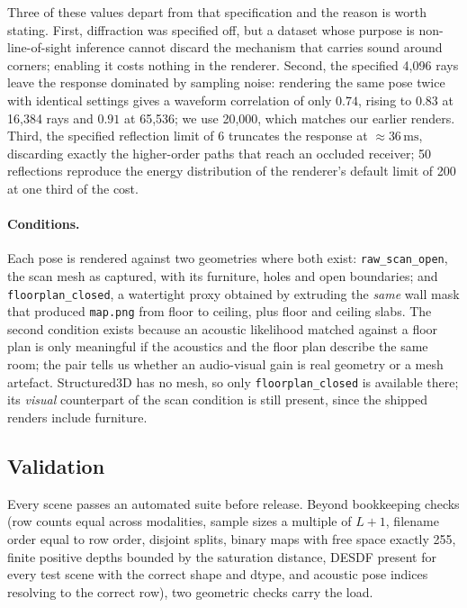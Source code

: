 Three of these values depart from that specification and the reason is worth
stating. First, diffraction was specified off, but a dataset whose purpose is
non-line-of-sight inference cannot discard the mechanism that carries sound around
corners; enabling it costs nothing in the renderer. Second, the specified 4{,}096
rays leave the response dominated by sampling noise: rendering the same pose twice
with identical settings gives a waveform correlation of only $0.74$, rising to
$0.83$ at 16{,}384 rays and $0.91$ at 65{,}536; we use 20{,}000, which matches our
earlier renders. Third, the specified reflection limit of 6 truncates the response
at ${\approx}36\,\mathrm{ms}$, discarding exactly the higher-order paths that reach
an occluded receiver; 50 reflections reproduce the energy distribution of the
renderer's default limit of 200 at one third of the cost.

\paragraph{Conditions.}
Each pose is rendered against two geometries where both exist:
\texttt{raw\_scan\_open}, the scan mesh as captured, with its furniture, holes and
open boundaries; and \texttt{floorplan\_closed}, a watertight proxy obtained by
extruding the \emph{same} wall mask that produced \texttt{map.png} from floor to
ceiling, plus floor and ceiling slabs. The second condition exists because an
acoustic likelihood matched against a floor plan is only meaningful if the
acoustics and the floor plan describe the same room; the pair tells us whether an
audio-visual gain is real geometry or a mesh artefact. Structured3D has no mesh, so
only \texttt{floorplan\_closed} is available there; its \emph{visual} counterpart
of the scan condition is still present, since the shipped renders include
furniture.

\subsection{Validation}
\label{sec:supp-validation}

Every scene passes an automated suite before release. Beyond bookkeeping checks
(row counts equal across modalities, sample sizes a multiple of $L{+}1$, filename
order equal to row order, disjoint splits, binary maps with free space exactly 255,
finite positive depths bounded by the saturation distance, DESDF present for every
test scene with the correct shape and dtype, and acoustic pose indices resolving to
the correct row), two geometric checks carry the load.


